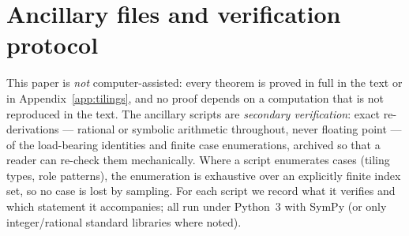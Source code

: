 \documentclass[11pt,reqno]{amsart}
\theoremstyle{plain}
\theoremstyle{definition}
\theoremstyle{remark}
\begin{document}
\section{Ancillary files and verification protocol}\label{app:ancillary}

This paper is \emph{not} computer-assisted: every theorem is proved in full
in the text or in Appendix~\ref{app:tilings}, and no proof depends on a
computation that is not reproduced in the text. The ancillary scripts are
\emph{secondary verification}: exact re-derivations --- rational or symbolic
arithmetic throughout, never floating point --- of the load-bearing
identities and finite case enumerations, archived so that a reader can
re-check them mechanically. Where a script enumerates cases (tiling types,
role patterns), the enumeration is exhaustive over an explicitly finite index
set, so no case is lost by sampling. For each script we record what it
verifies and which statement it accompanies; all run under Python~3 with
SymPy (or only integer/rational standard libraries where noted).
\end{document}
